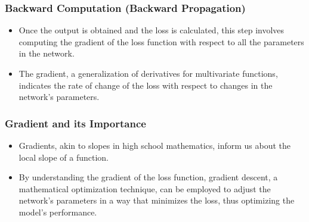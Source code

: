 \documentclass{article}
\begin{document}
\subsubsection{Backward Computation (Backward Propagation)}
\begin{itemize}
    \item Once the output is obtained and the loss is calculated, this step involves computing the gradient of the loss function with respect to all the parameters in the network.
    \item The gradient, a generalization of derivatives for multivariate functions, indicates the rate of change of the loss with respect to changes in the network's parameters.
\end{itemize}

\subsubsection{Gradient and its Importance}
\begin{itemize}
    \item Gradients, akin to slopes in high school mathematics, inform us about the local slope of a function.
    \item By understanding the gradient of the loss function, gradient descent, a mathematical optimization technique, can be employed to adjust the network's parameters in a way that minimizes the loss, thus optimizing the model's performance.
\end{itemize}
\end{document}
